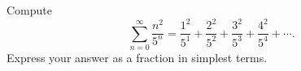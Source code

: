 Compute
\[\sum_{n=0}^{\infty}\dfrac{n^2}{5^n}=\dfrac{1^2}{5^1}+\dfrac{2^2}{5^2}+\dfrac{3^2}{5^3}+\dfrac{4^2}{5^4}+\cdots.\]
Express your answer as a fraction in simplest terms.
